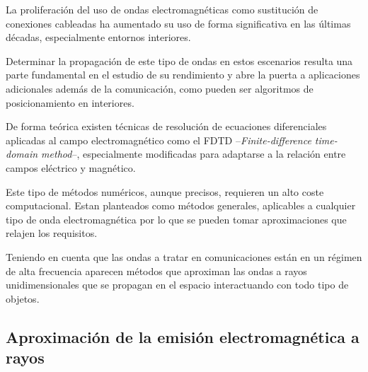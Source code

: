 


La proliferación del uso de ondas electromagnéticas como sustitución de conexiones cableadas ha aumentado su uso de forma significativa en las últimas décadas, especialmente entornos interiores.

Determinar la propagación de este tipo de ondas en estos escenarios resulta una parte fundamental en el estudio de su rendimiento y abre la puerta a aplicaciones adicionales además de la comunicación, como pueden ser algoritmos de posicionamiento en interiores.

De forma teórica existen técnicas de resolución de ecuaciones diferenciales aplicadas al campo electromagnético como el FDTD --\textit{Finite-difference time-domain method}--, especialmente modificadas para adaptarse a la relación entre campos eléctrico y magnético.\cite{Compilation}

Este tipo de métodos numéricos, aunque precisos, requieren un alto coste computacional.
Estan planteados como métodos generales, aplicables a cualquier tipo de onda electromagnética por lo que se pueden tomar aproximaciones que relajen los requisitos.

Teniendo en cuenta que las ondas a tratar en comunicaciones están en un régimen de alta frecuencia aparecen métodos que aproximan las ondas a rayos unidimensionales que se propagan en el espacio interactuando con todo tipo de objetos.

\subsection{Aproximación de la emisión electromagnética a rayos}


